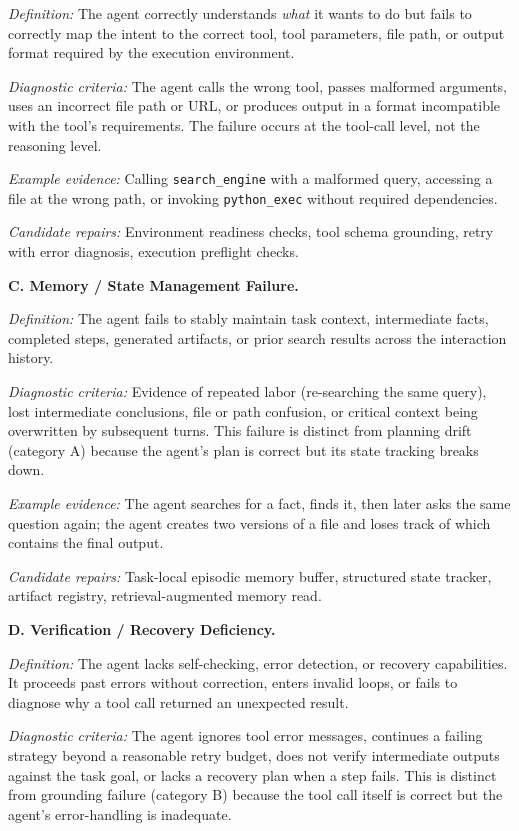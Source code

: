 \textit{Definition:} The agent correctly understands \emph{what} it wants to do but fails to correctly map the intent to the correct tool, tool parameters, file path, or output format required by the execution environment.

\textit{Diagnostic criteria:} The agent calls the wrong tool, passes malformed arguments, uses an incorrect file path or URL, or produces output in a format incompatible with the tool's requirements. The failure occurs at the tool-call level, not the reasoning level.

\textit{Example evidence:} Calling \texttt{search\_engine} with a malformed query, accessing a file at the wrong path, or invoking \texttt{python\_exec} without required dependencies.

\textit{Candidate repairs:} Environment readiness checks, tool schema grounding, retry with error diagnosis, execution preflight checks.

\bigskip
\noindent\textbf{C. Memory / State Management Failure.}

\textit{Definition:} The agent fails to stably maintain task context, intermediate facts, completed steps, generated artifacts, or prior search results across the interaction history.

\textit{Diagnostic criteria:} Evidence of repeated labor (re-searching the same query), lost intermediate conclusions, file or path confusion, or critical context being overwritten by subsequent turns. This failure is distinct from planning drift (category A) because the agent's plan is correct but its state tracking breaks down.

\textit{Example evidence:} The agent searches for a fact, finds it, then later asks the same question again; the agent creates two versions of a file and loses track of which contains the final output.

\textit{Candidate repairs:} Task-local episodic memory buffer, structured state tracker, artifact registry, retrieval-augmented memory read.

\bigskip
\noindent\textbf{D. Verification / Recovery Deficiency.}

\textit{Definition:} The agent lacks self-checking, error detection, or recovery capabilities. It proceeds past errors without correction, enters invalid loops, or fails to diagnose why a tool call returned an unexpected result.

\textit{Diagnostic criteria:} The agent ignores tool error messages, continues a failing strategy beyond a reasonable retry budget, does not verify intermediate outputs against the task goal, or lacks a recovery plan when a step fails. This is distinct from grounding failure (category B) because the tool call itself is correct but the agent's error-handling is inadequate.

